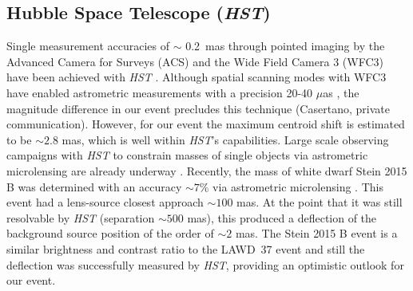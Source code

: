 \documentclass[fleqn,usenatbib]{mnras}
\begin{document}
\subsection{Hubble Space Telescope ({\it HST})}

Single measurement accuracies of $\sim$ 0.2\, mas through pointed imaging by the Advanced Camera for Surveys (ACS) and the Wide Field Camera 3 (WFC3) have been achieved with {\it HST} \citep[see eg.][]{Bellini2011}. Although spatial scanning modes with WFC3 have enabled astrometric measurements with a precision 20-40 $\mu$as \cite{Casertano2016}, the magnitude difference in our event precludes this technique (Casertano, private communication). However, for our event the maximum centroid shift is estimated to be $\sim 2.8$ mas, which is well within {\it HST}'s capabilities. Large scale observing campaigns with {\it HST} to constrain masses of single objects via astrometric microlensing are already underway \citep{Kains2017}. Recently, the mass of white dwarf Stein 2015 B was determined with an accuracy $\sim7\%$ via astrometric microlensing \citep{Sahu2017}. This event had a lens-source closest approach $\sim100$ mas. At the point that it was still resolvable by {\it HST} (separation $\sim 500$ mas), this produced a deflection of the background source position of the order of $\sim2$ mas. The Stein 2015 B event is a similar brightness and contrast ratio to the LAWD~37 event and still the deflection was successfully measured by {\it HST}, providing an optimistic outlook for our event.
 

 

\end{document}
